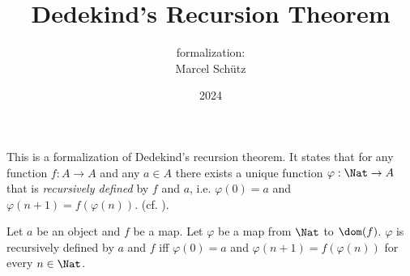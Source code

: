 \documentclass{article}
\title{Dedekind's Recursion Theorem}
\author{\Naproche formalization:\\[0.5em]Marcel Schütz}
\date{2024}
\begin{document}
  \maketitle


  \noindent This is a formalization of Dedekind's recursion theorem.
  It states that for any function $f : A \to A$ and any $a \in A$
  there exists a unique function
  $\varphi : \Nat \to A$ that is \emph{recursively defined} by
  $f$ and $a$, i.e. $\varphi(0) = a$ and
  $\varphi(n + 1) = f(\varphi(n))$.
  (cf. \cite{Ebbinghaus1991}).

  \begin{forthel}
    \begin{definition*}
      Let $a$ be an object and $f$ be a map.
      Let $\varphi$ be a map from $\Nat$ to $\dom(f)$.
      $\varphi$ is recursively defined by $a$ and $f$ iff $\varphi(0) = a$ and $\varphi(n + 1) = f(\varphi(n))$ for every $n \in \Nat$.
    \end{definition*}
  \end{forthel}
\end{document}
